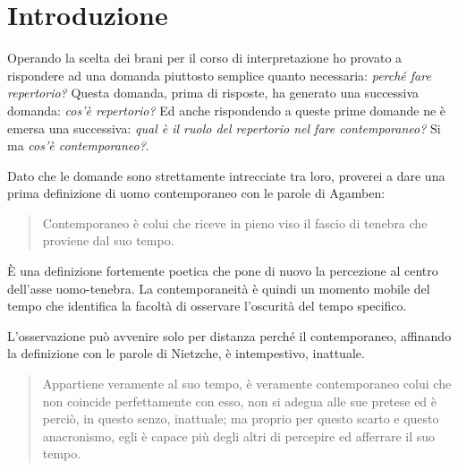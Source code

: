 

\chapter*{Introduzione}

Operando la scelta dei brani per il corso di interpretazione ho provato a rispondere ad una domanda piuttosto semplice quanto necessaria: \emph{perché fare repertorio?} Questa domanda, prima di risposte, ha generato una successiva domanda: \emph{cos'è repertorio?} Ed anche rispondendo a queste prime domande ne è emersa una successiva: \emph{qual è il ruolo del repertorio nel fare contemporaneo?} Si ma \emph{cos'è contemporaneo?}.


Dato che le domande sono strettamente intrecciate tra loro, proverei a dare una prima definizione di uomo contemporaneo con le parole di Agamben:

\begin{quote}
	Contemporaneo è colui che riceve in pieno viso il fascio di tenebra che proviene dal suo tempo.
\end{quote}

È una definizione fortemente poetica che pone di nuovo la percezione al centro dell'asse uomo-tenebra.
La contemporaneità è quindi un momento mobile del tempo che identifica la facoltà di osservare l'oscurità del tempo specifico.

L'osservazione può avvenire solo per distanza perché il contemporaneo, affinando la definizione con le parole di Nietzche, è intempestivo, inattuale.

\begin{quote}
	Appartiene veramente al suo tempo, è veramente contemporaneo colui che non coincide perfettamente con esso, non si adegua alle sue pretese ed è perciò, in questo senzo, inattuale; ma proprio per questo scarto e questo anacronismo, egli è capace pi\`u degli altri di percepire ed afferrare il suo tempo.
\end{quote}

